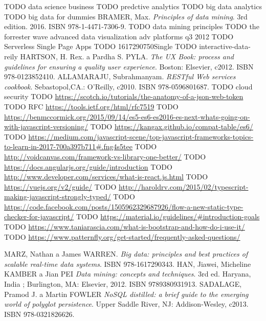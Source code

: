 \begin{thebibliography}{99}
TODO data science business
TODO predctive analytics
TODO big data analytics
TODO big data for dummies
BRAMER, Max.
\textit{Principles of data mining}.
3rd edition. 2016. ISBN 978-1-4471-7306-9.
TODO data mining principles
TODO the forrester wave advanced data visualization adv platforms q3 2012
TODO Serverless Single Page Apps
TODO 1617290750Single
TODO interactive-data-reily
HARTSON, H. Rex. a Pardha S. PYLA.
\textit{The UX Book: process and guidelines for ensuring a quality user experience}.
Boston: Elsevier, c2012. ISBN 978-0123852410.
ALLAMARAJU, Subrahmanyam.
\textit{RESTful Web services cookbook}.
Sebastopol,CA.: O'Reilly, c2010. ISBN 978-0596801687.
TODO cloud security
TODO \url{https://scotch.io/tutorials/the-anatomy-of-a-json-web-token}
TODO RFC \url{https://tools.ietf.org/html/rfc7519}
TODO \url{https://benmccormick.org/2015/09/14/es5-es6-es2016-es-next-whats-going-on-with-javascript-versioning/}
TODO \url{https://kangax.github.io/compat-table/es6/}
TODO \url{https://medium.com/javascript-scene/top-javascript-frameworks-topics-to-learn-in-2017-700a397b711#.fng4s5tee}
TODO \url{http://voidcanvas.com/framework-vs-library-one-better/}
TODO \url{https://docs.angularjs.org/guide/introduction}
TODO \url{http://www.developer.com/services/what-is-react.js.html}
TODO \url{https://vuejs.org/v2/guide/}
TODO \url{http://haroldrv.com/2015/02/typescript-making-javascript-strongly-typed/}
TODO \url{https://code.facebook.com/posts/1505962329687926/flow-a-new-static-type-checker-for-javascript/}
TODO \url{https://material.io/guidelines/#introduction-goals}
TODO \url{https://www.taniarascia.com/what-is-bootstrap-and-how-do-i-use-it/}
TODO \url{https://www.patternfly.org/get-started/frequently-asked-questions/}

MARZ, Nathan a James WARREN.
\textit{Big data: principles and best practices of scalable real-time data systems}.
ISBN 978-1617290343.
HAN, Jiawei, Micheline KAMBER a Jian PEI
\textit{Data mining: concepts and techniques}.
3rd ed. Haryana, India ; Burlington, MA: Elsevier, 2012. ISBN 9789380931913.
SADALAGE, Pramod J. a Martin FOWLER
\textit{NoSQL distilled: a brief guide to the emerging world of polyglot persistence}.
Upper Saddle River, NJ: Addison-Wesley, c2013. ISBN 978-0321826626.

\end{thebibliography}
